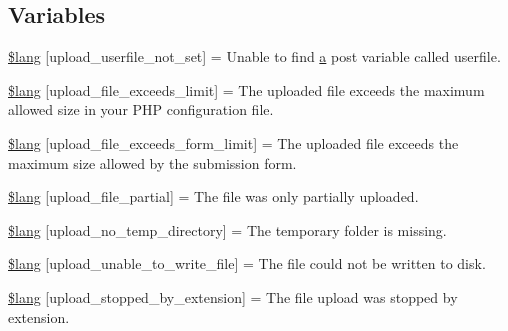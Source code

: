 \subsection*{Variables}
\begin{DoxyCompactItemize}
\item 
\hyperlink{_admin_2system_2language_2english_2upload__lang_8php_a6d12ff4074b1e4c6f22a4a5107fae5ee}{\$lang} \mbox{[}\textquotesingle{}upload\+\_\+userfile\+\_\+not\+\_\+set\textquotesingle{}\mbox{]} = \textquotesingle{}Unable to find \hyperlink{_admin_2assets_2js_2bootstrap_8min_8js_a1f5870dcf487187f13d5fd328ed9e6e7}{a} post variable called userfile.\textquotesingle{}
\item 
\hyperlink{_admin_2system_2language_2english_2upload__lang_8php_a9028f049ebbe292a27e0e2b2e5f7d660}{\$lang} \mbox{[}\textquotesingle{}upload\+\_\+file\+\_\+exceeds\+\_\+limit\textquotesingle{}\mbox{]} = \textquotesingle{}The uploaded file exceeds the maximum allowed size in your P\+H\+P configuration file.\textquotesingle{}
\item 
\hyperlink{_admin_2system_2language_2english_2upload__lang_8php_af6f65d563af150d50dfc6957079fd529}{\$lang} \mbox{[}\textquotesingle{}upload\+\_\+file\+\_\+exceeds\+\_\+form\+\_\+limit\textquotesingle{}\mbox{]} = \textquotesingle{}The uploaded file exceeds the maximum size allowed by the submission form.\textquotesingle{}
\item 
\hyperlink{_admin_2system_2language_2english_2upload__lang_8php_a79751b02ce35007a90bd9052f83deed9}{\$lang} \mbox{[}\textquotesingle{}upload\+\_\+file\+\_\+partial\textquotesingle{}\mbox{]} = \textquotesingle{}The file was only partially uploaded.\textquotesingle{}
\item 
\hyperlink{_admin_2system_2language_2english_2upload__lang_8php_ac7144f4992346816875bac28488ef715}{\$lang} \mbox{[}\textquotesingle{}upload\+\_\+no\+\_\+temp\+\_\+directory\textquotesingle{}\mbox{]} = \textquotesingle{}The temporary folder is missing.\textquotesingle{}
\item 
\hyperlink{_admin_2system_2language_2english_2upload__lang_8php_a620b622468d4e7781fed6316440c85e7}{\$lang} \mbox{[}\textquotesingle{}upload\+\_\+unable\+\_\+to\+\_\+write\+\_\+file\textquotesingle{}\mbox{]} = \textquotesingle{}The file could not be written to disk.\textquotesingle{}
\item 
\hyperlink{_admin_2system_2language_2english_2upload__lang_8php_ae97257deea3dddb33be4bbc6510a464b}{\$lang} \mbox{[}\textquotesingle{}upload\+\_\+stopped\+\_\+by\+\_\+extension\textquotesingle{}\mbox{]} = \textquotesingle{}The file upload was stopped by extension.\textquotesingle{}

\end{DoxyCompactItemize}
